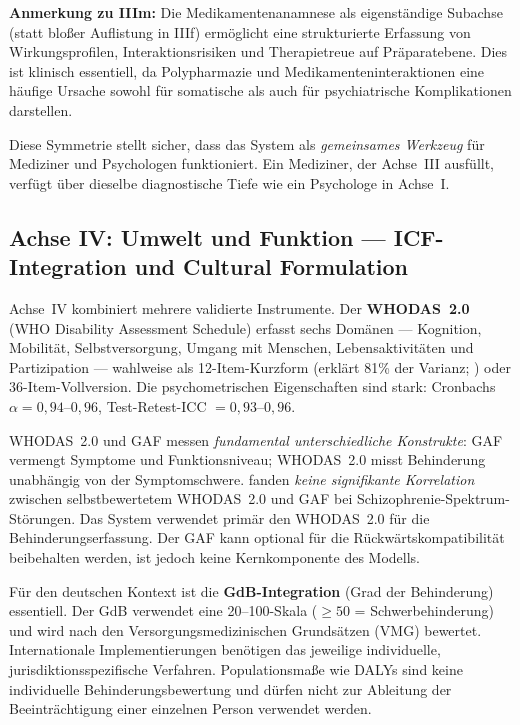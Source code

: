 \documentclass[11pt,a4paper]{article}
\begin{document}
\textbf{Anmerkung zu IIIm:} Die Medikamentenanamnese als eigenst\"andige Subachse (statt blo\ss{}er Auflistung in IIIf) erm\"oglicht eine strukturierte Erfassung von Wirkungsprofilen, Interaktionsrisiken und Therapietreue auf Pr\"aparatebene. Dies ist klinisch essentiell, da Polypharmazie und Medikamenteninteraktionen eine h\"aufige Ursache sowohl f\"ur somatische als auch f\"ur psychiatrische Komplikationen darstellen.

Diese Symmetrie stellt sicher, dass das System als \textit{gemeinsames Werkzeug} f\"ur Mediziner und Psychologen funktioniert. Ein Mediziner, der Achse~III ausf\"ullt, verf\"ugt \"uber dieselbe diagnostische Tiefe wie ein Psychologe in Achse~I.

\subsection{Achse IV: Umwelt und Funktion --- ICF-Integration und Cultural Formulation}
\label{sec:achse4}

Achse~IV kombiniert mehrere validierte Instrumente. Der \textbf{WHODAS~2.0} \citep{WHO2010} (WHO Disability Assessment Schedule) erfasst sechs Dom\"anen --- Kognition, Mobilit\"at, Selbstversorgung, Umgang mit Menschen, Lebensaktivit\"aten und Partizipation --- wahlweise als 12-Item-Kurzform (erkl\"art 81\% der Varianz; \citealp{Luciano2010}) oder 36-Item-Vollversion. Die psychometrischen Eigenschaften sind stark: Cronbachs $\alpha = 0{,}94$--$0{,}96$, Test-Retest-ICC $= 0{,}93$--$0{,}96$.

WHODAS~2.0 und GAF messen \textit{fundamental unterschiedliche Konstrukte}: GAF vermengt Symptome und Funktionsniveau; WHODAS~2.0 misst Behinderung unabh\"angig von der Symptomschwere. \citet{Gspandl2018} fanden \textit{keine signifikante Korrelation} zwischen selbstbewertetem WHODAS~2.0 und GAF bei Schizophrenie-Spektrum-St\"orungen. Das System verwendet prim\"ar den WHODAS~2.0 f\"ur die Behinderungserfassung. Der GAF kann optional f\"ur die R\"uckw\"artskompatibilit\"at beibehalten werden, ist jedoch keine Kernkomponente des Modells.

F\"ur den deutschen Kontext ist die \textbf{GdB-Integration} (Grad der Behinderung) essentiell. Der GdB verwendet eine 20--100-Skala ($\geq 50$ = Schwerbehinderung) und wird nach den Versorgungsmedizinischen Grunds\"atzen (VMG) bewertet. Internationale Implementierungen ben\"otigen das jeweilige individuelle, jurisdiktionsspezifische Verfahren. Populationsma\ss{}e wie DALYs sind keine individuelle Behinderungsbewertung und d\"urfen nicht zur Ableitung der Beeintr\"achtigung einer einzelnen Person verwendet werden.
\end{document}

